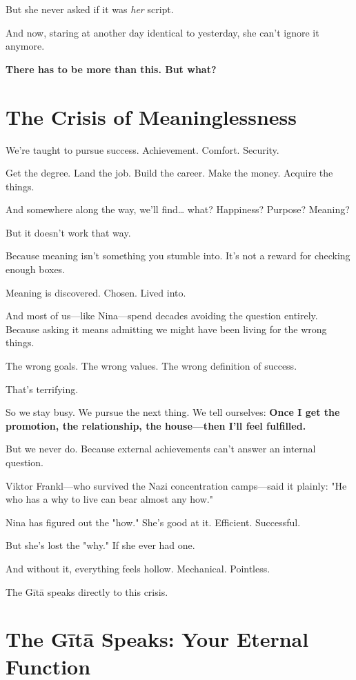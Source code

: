 \documentclass[11pt,twoside]{book}
\begin{document}
But she never asked if it was \emph{her} script.

And now, staring at another day identical to yesterday, she can't ignore it anymore.

\textbf{There has to be more than this. But what?}

\section*{The Crisis of Meaninglessness}

We're taught to pursue success. Achievement. Comfort. Security.

Get the degree. Land the job. Build the career. Make the money. Acquire the things.

And somewhere along the way, we'll find\ldots{} what? Happiness? Purpose? Meaning?

But it doesn't work that way.

Because meaning isn't something you stumble into. It's not a reward for checking enough boxes.

Meaning is discovered. Chosen. Lived into.

And most of us—like Nina—spend decades avoiding the question entirely. Because asking it means admitting we might have been living for the wrong things.

The wrong goals. The wrong values. The wrong definition of success.

That's terrifying.

So we stay busy. We pursue the next thing. We tell ourselves: \textbf{Once I get the promotion, the relationship, the house—then I'll feel fulfilled.}

But we never do. Because external achievements can't answer an internal question.

Viktor Frankl—who survived the Nazi concentration camps—said it plainly: "He who has a why to live can bear almost any how."

Nina has figured out the "how." She's good at it. Efficient. Successful.

But she's lost the "why." If she ever had one.

And without it, everything feels hollow. Mechanical. Pointless.

The Gītā speaks directly to this crisis.

\section*{The Gītā Speaks: Your Eternal Function}
\end{document}
